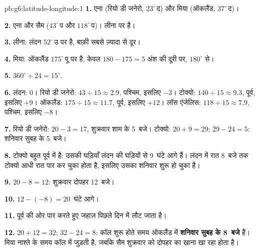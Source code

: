 \begin{solution}{pb:g6:latitude-longitude:1}
\textbf{1.} एना (रियो डी जनेरो, $23^\circ$\,द) और मिया (ऑकलैंड,
$37^\circ$\,द)।

\textbf{2.} एना और सैम ($43^\circ$\,प और $118^\circ$\,प)। लीना
 पर है।

\textbf{3.} लीना: लंदन $52^\circ$\,उ पर है, बाक़ी सबसे ज़्यादा  से
दूर।

\textbf{4.} मिया: ऑकलैंड $175^\circ$\,पू पर है, केवल $180 - 175 = 5$
अंश की दूरी पर, $180^\circ$  से।

\textbf{5.} $360^\circ \div 24 = 15^\circ$.

\textbf{6.} लंदन: $0$। रियो डी जनेरो: $43 \div 15 \approx 2.9$, पश्चिम,
इसलिए $-3$। टोक्यो: $140 \div 15 \approx 9.3$, पूर्व, इसलिए $+9$। ऑकलैंड:
$175 \div 15 \approx 11.7$, पूर्व, इसलिए $+12$। लॉस एंजेलिस:
$118 \div 15 \approx 7.9$, पश्चिम, इसलिए $-8$।

\textbf{7.} रियो डी जनेरो: $20 - 3 = 17$, शुक्रवार शाम के 5~बजे। टोक्यो:
$20 + 9 = 29$; $29 - 24 = 5$: शनिवार सुबह के 5~बजे।

\textbf{8.} टोक्यो बहुत पूर्व में है: उसकी घड़ियाँ लंदन की घड़ियों से 9~घंटे आगे हैं।
लंदन में रात 8~बजे तक टोक्यो आधी रात पार कर चुका होता है, इसलिए उसका
शनिवार शुरू हो चुका है।

\textbf{9.} $20 - 8 = 12$: शुक्रवार दोपहर 12~बजे।

\textbf{10.} $12 - (-8) = 20$~घंटे आगे।

\textbf{11.} पूर्व की ओर  पार करते हुए जहाज़ पिछले
दिन में लौट जाता है।

\textbf{12.} $20 + 12 = 32$; $32 - 24 = 8$: कॉल शुरू होते समय ऑकलैंड में
\textbf{शनिवार सुबह के 8~बजे} हैं। मिया नाश्ते के समय कॉल में जुड़ती है, जबकि
सैम शुक्रवार को दोपहर का खाना खा रहा होता है।
\end{solution}

